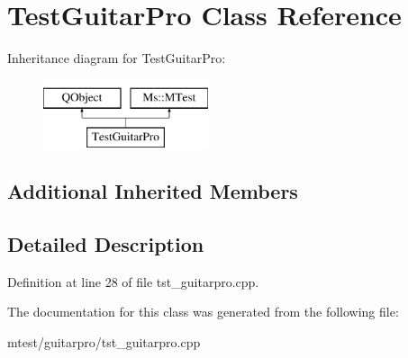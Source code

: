 \hypertarget{class_test_guitar_pro}{}\section{Test\+Guitar\+Pro Class Reference}
\label{class_test_guitar_pro}
Inheritance diagram for Test\+Guitar\+Pro\+:\begin{figure}[H]
\begin{center}
\leavevmode
\includegraphics[height=2.000000cm]{class_test_guitar_pro}
\end{center}
\end{figure}
\subsection*{Additional Inherited Members}


\subsection{Detailed Description}


Definition at line 28 of file tst\+\_\+guitarpro.\+cpp.



The documentation for this class was generated from the following file\+:\begin{DoxyCompactItemize}
\item 
mtest/guitarpro/tst\+\_\+guitarpro.\+cpp\end{DoxyCompactItemize}
